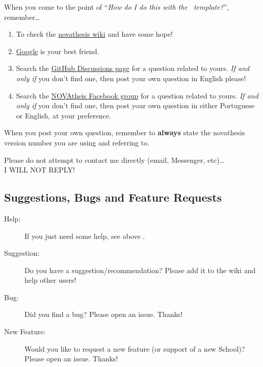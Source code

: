 When you come to the point of “\emph{How do I do this with the \novathesis\ template?}”, remember…

\begin{enumerate}
  \item To check the \href{https://github.com/joaomlourenco/novathesis/wiki}{\gls{novathesis} wiki} and have some hope!  \emojiSmile
  \item \href{https://www.google.com}{Google} is your best friend.
  \item Search the \href{https://github.com/joaomlourenco/novathesis/discussions}{GitHub Discussions page} for a question related to yours.  \emph{If and only if} you don't find one, then post your own question in English please!
  \item Search the \href{https://www.facebook.com/groups/novathesis}{NOVAtheis Facebook group} for a question related to yours.  \emph{If and only if} you don't find one, then post your own question in either Portuguese or English, at your preference.
\end{enumerate}

When you post your own question, remember to \textbf{always} state the \gls{novathesis} version number you are using and referring to.

\begin{warningbox}
	\centering
Please do not attempt to contact me directly (email, Messenger, etc)…\\I WILL NOT REPLY!
\end{warningbox}


\subsection{Suggestions, Bugs and Feature Requests} %
\label{sub:suggestions_bugs_and_feature_requests}

\begin{description}
  \item[Help:] If you just need some help, see above .
  \item[Suggestion:]  Do you have a suggestion/recommendation? Please add it to the wiki and help other users!
  \item[Bug:]  Did you find a bug? Please open an issue. Thanks!
  \item[New Feature:]  Would you like to request a new feature (or support of a new School)? Please open an issue. Thanks!

\end{description}



